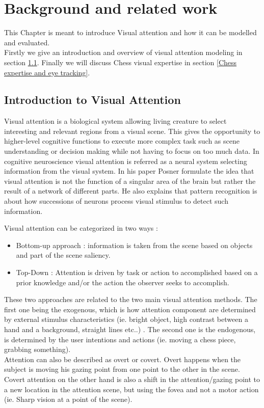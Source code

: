 
\chapter{Background and related work} \label{SoA}

This Chapter is meant to introduce Visual attention and how it can be modelled and evaluated.\\
Firstly we give an introduction and overview of visual attention modeling in section \ref{Introduction to Visual Attention}. Finally we will discuss Chess visual expertise in section \ref{Chess expertise and eye tracking}.

\section{ Introduction to Visual Attention} \label{Introduction to Visual Attention}

Visual attention is a biological system allowing living creature to select interesting and relevant regions from a visual scene. This gives the opportunity to higher-level cognitive functions to execute more complex task such as scene understanding or decision making while not having to focus on too much data. In cognitive neuroscience visual attention is referred as a neural system selecting information from the visual system. In his paper Posner \cite{posner1990} formulate the idea that visual attention is not the function of a singular area of the brain but rather the result of a network of different parts. He also explains that pattern recognition  is about how successions of neurons process visual stimulus to detect such information. 

Visual attention can be categorized in two ways :
\begin{itemize}
    \item Bottom-up approach : information is taken from the scene based on objects and part of the scene saliency.
    \item Top-Down : Attention is driven by task or action to accomplished based on a prior knowledge and/or the action the observer seeks to accomplish.
\end{itemize}
These two approaches are related to the two main visual attention methods. The first one being the exogenous, which is how attention component are determined by external stimulus characteristics (ie. bright object, high contrast between a hand and a background, straight lines etc..) . The second one is the endogenous, is determined by the user intentions and actions (ie. moving a chess piece, grabbing something).\\ Attention can also be described as overt or covert. Overt happens when the subject is moving his gazing point from one point to the other in the scene. Covert attention on the other hand  is also a shift in the attention/gazing point to a new location in the attention scene, but using the fovea and not a  motor action (ie. Sharp vision at a point of the scene).

